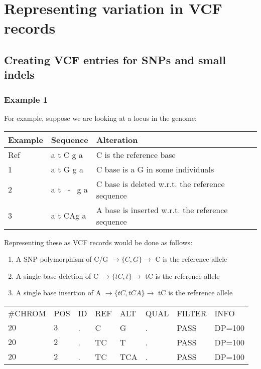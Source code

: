 \documentclass[8pt]{article}
\begin{document}
\section{Representing variation in VCF records}
\subsection{Creating VCF entries for SNPs and small indels}
\subsubsection{Example 1}
For example, suppose we are looking at a locus in the genome:

\vspace{0.3cm}
\begin{tabular}{ | l | l | l | }
\hline
Example & Sequence & Alteration \\ \hline
Ref & a t C g a & C is the reference base \\ \hline
1   & a t G g a & C base is a G in some individuals \\ \hline
2   & a t \ - \ g a & C base is deleted w.r.t. the reference sequence\\ \hline
3   & a t CAg a & A base is inserted w.r.t. the reference sequence \\ \hline
\end{tabular}
\vspace{0.3cm}

Representing these as VCF records would be done as follows:
\begin{enumerate}
  \item A SNP polymorphism of C/G $\rightarrow \{C,G\} \rightarrow$ C is the reference allele
  \item A single base deletion of C $\rightarrow \{tC,t\} \rightarrow$ tC is the reference allele
  \item A single base insertion of A $\rightarrow \{tC,tCA\} \rightarrow$ tC is the reference allele
\end{enumerate}

\begin{tabular}{ l l l l l l l l}
	\#CHROM & POS & ID & REF & ALT & QUAL & FILTER & INFO \\
	$20$ & $3$ & . & C & G & . & PASS & DP=100 \\
	$20$ & $2$ & . & TC & T & . & PASS & DP=100 \\
	$20$ & $2$ & . & TC & TCA & . & PASS & DP=100 \\
\end{tabular}
\end{document}
